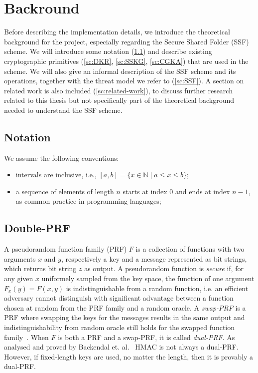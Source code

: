 \chapter{Backround}\label{ch:background}

Before describing the implementation details, we introduce the theoretical
background for the project, especially regarding the Secure Shared Folder 
(SSF) scheme. We will introduce some notation (\cref{sc:notation}) and
describe existing cryptographic primitives (\cref{sc:DKR}, \cref{sc:SSKG}, \cref{sc:CGKA})
that are used in the scheme.
We will also give an informal description of the SSF scheme and its operations,
together with the threat model we refer to (\cref{sc:SSF}).
A section on related work is also included (\cref{sc:related-work}), to discuss further 
research related to this thesis but not specifically 
part of the theoretical background needed to understand the SSF scheme.

\section{Notation}\label{sc:notation}

We assume the following conventions:
\begin{itemize}
    \item intervals are inclusive, i.e., $[a, b] = \{x \in \mathbb{N} \mid a \leq x \leq b\}$;
    \item a sequence of elements of length $n$ starts at index $0$ and ends at index $n-1$, as common practice in programming languages;
\end{itemize}


\section{Double-PRF}

A pseudorandom function family (PRF) $F$ is a collection of functions
with two arguments $x$ and $y$, respectively a key and a message
represented as bit strings, which returns bit string $z$ as output.
A pseudorandom function is \textit{secure} if, for any given $x$
uniformely sampled from the key space, the function of one argument
$F_x(y) = F(x, y)$ is indistinguishable from a random function, i.e.
an efficient adversary cannot distinguish with significant advantage
between a function chosen at random from the PRF family and a random oracle.
A \textit{swap-PRF} is a PRF where swapping the keys for the messages
results in the same output and indistinguishability from random oracle
still holds for the swapped function family~\cite{EPRINT:BelLys15}.
When $F$ is both a PRF and a swap-PRF, it is called \textit{dual-PRF}.
As analysed and proved by Backendal et. al.~\cite{C:BBGS23} HMAC is not always a
dual-PRF. However, if fixed-length keys are used, no matter the length,
then it is provably a dual-PRF.

